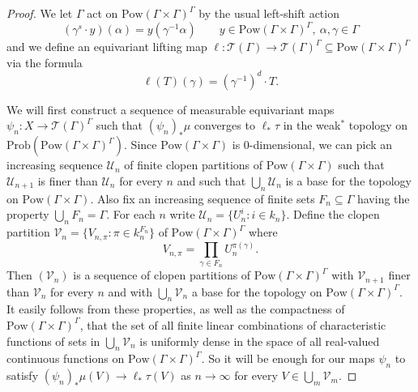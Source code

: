 \documentclass[12pt]{amsart}
\theoremstyle{definition}
\def\cal{\mathcal}
\newcommand{\Prob}{\mathrm{Prob}}
\newcommand{\Pow}[1]{\mathrm{Pow}(#1)}
\begin{document}
\begin{proof}
	We let $\Gamma$ act on $\Pow{\Gamma \times \Gamma}^\Gamma$ by the usual left-shift action
	\[(\gamma^s \cdot y)(\alpha) = y(\gamma^{-1} \alpha) \qquad y \in \Pow{\Gamma \times \Gamma}^\Gamma, \ \alpha, \gamma \in \Gamma\]
	and we define an equivariant lifting map $\ell : \cal T(\Gamma) \rightarrow \cal T(\Gamma)^\Gamma \subseteq \Pow{\Gamma \times \Gamma}^\Gamma$ via the formula
	\[\ell(T)(\gamma) = (\gamma^{-1})^d \cdot T.\]
	
	We will first construct a sequence of measurable equivariant maps $\psi_n : X \rightarrow \cal T(\Gamma)^\Gamma$ such that $(\psi_n)_* \mu$ converges to $\ell_* \tau$ in the weak$^*$ topology on $\Prob(\Pow{\Gamma \times \Gamma}^\Gamma)$. Since $\Pow{\Gamma \times \Gamma}$ is $0$-dimensional, we can pick an increasing sequence $\cal U_n$ of finite clopen partitions of $\Pow{\Gamma \times \Gamma}$ such that $\cal U_{n+1}$ is finer than $\cal U_n$ for every $n$ and such that $\bigcup_n \cal U_n$ is a base for the topology on $\Pow{\Gamma \times \Gamma}$. Also fix an increasing sequence of finite sets $F_n \subseteq \Gamma$ having the property $\bigcup_n F_n = \Gamma$. For each $n$ write $\cal U_n = \{U_n^i : i \in k_n\}$. Define the clopen partition $\cal V_n = \{V_{n,\pi} : \pi \in k_n^{F_n}\}$ of $\Pow{\Gamma \times \Gamma}^\Gamma$ where
	\[V_{n,\pi} = \prod_{\gamma \in F_n} U_n^{\pi(\gamma)}.\]
	Then $(\cal V_n)$ is a sequence of clopen partitions of $\Pow{\Gamma \times \Gamma}^\Gamma$ with $\cal V_{n+1}$ finer than $\cal V_n$ for every $n$ and with $\bigcup_n \cal V_n$ a base for the topology on $\Pow{\Gamma \times \Gamma}^\Gamma$. It easily follows from these properties, as well as the compactness of $\Pow{\Gamma \times \Gamma}^\Gamma$, that the set of all finite linear combinations of characteristic functions of sets in $\bigcup_n \cal V_n$ is uniformly dense in the space of all real-valued continuous functions on $\Pow{\Gamma \times \Gamma}^\Gamma$. So it will be enough for our maps $\psi_n$ to satisfy $(\psi_n)_* \mu(V) \rightarrow \ell_* \tau(V)$ as $n \rightarrow \infty$ for every $V \in \bigcup_m \cal V_m$.
	

\end{proof}
\end{document}
